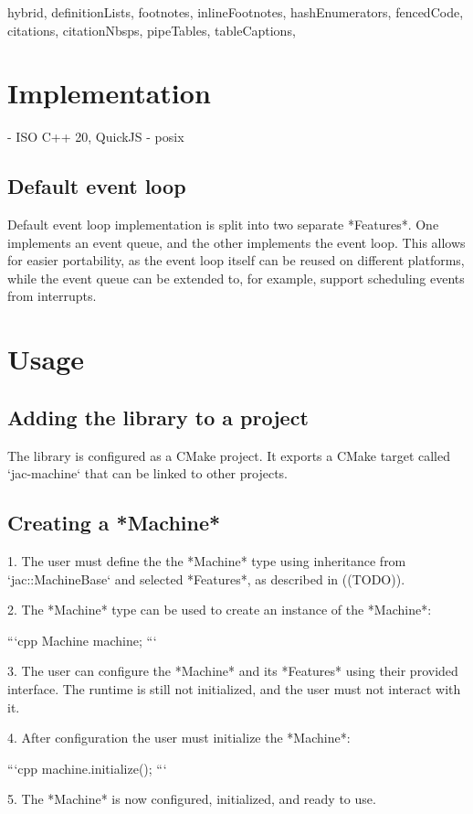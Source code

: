 \documentclass[
  digital,
  oneside,
  nosansbold,
  nocolorbold,
  lof,
  lot
]{fithesis4}
\begin{document}
\begin{markdown*}{%
  hybrid,
  definitionLists,
  footnotes,
  inlineFootnotes,
  hashEnumerators,
  fencedCode,
  citations,
  citationNbsps,
  pipeTables,
  tableCaptions,
}
\section{Implementation}

- ISO C++ 20, QuickJS - posix

\subsection{Default event loop}

Default event loop implementation is split into two separate *Features*. One implements an event queue, and the other implements the event loop. This allows for easier portability, as the event loop itself can be reused on different platforms, while the event queue can be extended to, for example, support scheduling events from interrupts.


\section{Usage}

\subsection{Adding the library to a project}

The library is configured as a CMake project. It exports a CMake target called `jac-machine` that can be linked to other projects.

\subsection{Creating a *Machine*}

 1. The user must define the the *Machine* type using inheritance from `jac::MachineBase` and selected *Features*, as described in ((TODO)).

 2. The *Machine* type can be used to create an instance of the *Machine*:

```cpp
Machine machine;
```

 3. The user can configure the *Machine* and its *Features* using their provided interface. The runtime is still not initialized, and the user must not interact with it.

 4. After configuration the user must initialize the *Machine*:

```cpp
machine.initialize();
```

 5. The *Machine* is now configured, initialized, and ready to use.


\end{markdown*}
\end{document}
